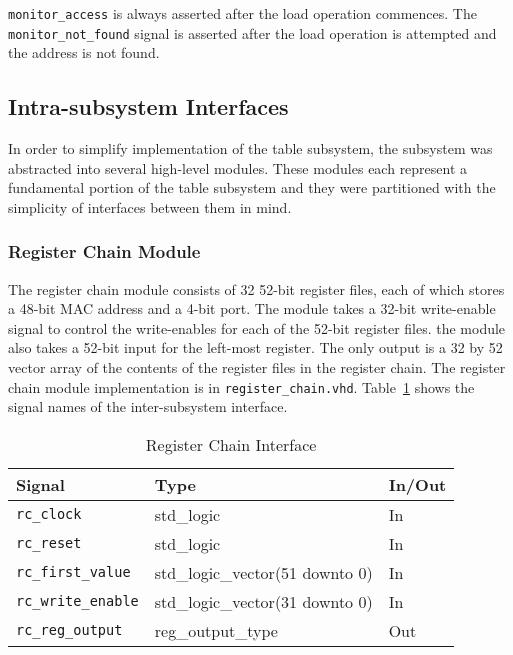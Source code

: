 \documentclass{article}
\begin{document}
\texttt{monitor\_access} is always asserted after the load operation commences. The \texttt{monitor\_not\_found} signal is asserted after the load operation is attempted and the address is not found.

\subsection{Intra-subsystem Interfaces}

In order to simplify implementation of the table subsystem, the subsystem was abstracted into several high-level modules. These modules each represent a fundamental portion of the table subsystem and they were partitioned with the simplicity of interfaces between them in mind. 

\subsubsection{Register Chain Module}

The register chain module consists of 32 52-bit register files, each of which stores a 48-bit MAC address and a 4-bit port. The module takes a 32-bit write-enable signal to control the write-enables for each of the 52-bit register files. the module also takes a 52-bit input for the left-most register. The only output is a 32 by 52 vector array of the contents of the register files in the register chain. The register chain module implementation is in \texttt{register\_chain.vhd}. Table~\ref{tab:reg} shows the signal names of the inter-subsystem interface. 


\begin{table}[h]
    \begin{center}
        \begin{tabular}{lll}\hline
        Signal & Type & In/Out \\
        \hline
        \texttt{rc\_clock} & std\_logic & In \\
        \hline
        \texttt{rc\_reset} & std\_logic & In \\
        \hline
        \texttt{rc\_first\_value} & std\_logic\_vector(51 downto 0) & In \\
        \hline
        \texttt{rc\_write\_enable} & std\_logic\_vector(31 downto 0) & In \\
        \hline
        \texttt{rc\_reg\_output} & reg\_output\_type & Out \\
        \hline
        \end{tabular}
        \caption{Register Chain Interface}\label{tab:reg}
    \end{center}
\end{table}
\end{document}
